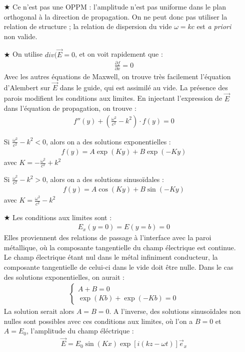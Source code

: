 \documentclass{report}
\begin{document}
\begin{itemize}

	\item[$\bigstar$] Ce n'est pas une OPPM : l'amplitude n'est pas uniforme dans le plan orthogonal à la direction de propagation. On ne peut donc pas utiliser la relation de structure ; la relation de dispersion du vide $\omega=kc$ est \textit{a priori} non valide.
	
	\item[$\bigstar$] On utilise $div(\vec{E}=0$, et on voit rapidement que :
	\begin{align*}
		\frac{\partial f}{\partial x} =0 
	\end{align*}
	Avec les autres équations de Maxwell, on trouve très facilement l'équation d'Alembert sur $\vec{E}$ dans le guide, qui est assimilé au vide. La présence des parois modifient les conditions aux limites. En injectant l'expression de $\vec{E}$ dans l'équation de propagation, on trouve :
	\begin{align*}
		f''(y)+\left(\frac{\omega^2}{c^2} - k^2 \right)\cdot f(y) =0
	\end{align*}
	
	Si $\frac{\omega^2}{c^2} - k^2<0$, alors on a des solutions exponentielles :
	\begin{align*}
		f(y)=A\exp(Ky)+B\exp(-Ky)
	\end{align*}
	avec $K=-\frac{\omega^2}{c^2} + k^2$
	
	Si $\frac{\omega^2}{c^2} - k^2>0$, alors on a des solutions sinusoïdales :
	\begin{align*}
		f(y)=A\cos(Ky)+B\sin(-Ky)
	\end{align*}
	avec $K=\frac{\omega^2}{c^2} - k^2$
	
	\item[$\bigstar$] Les conditions aux limites sont :
	\begin{align*}
		E_x(y=0)=E(y=b)=0
	\end{align*}
	Elles proviennent des relations de passage à l'interface avec la paroi métallique, où la composante tangentielle du champ électrique est continue. Le champ électrique étant nul dans le métal infiniment conducteur, la composante tangentielle de celui-ci dans le vide doit être nulle.
	Dans le cas des solutions exponentielles, on aurait :
	\begin{align}
    	\begin{cases}
        A+B  =0\\
     	\exp(Kb)+\exp(-Kb) = 0
    \end{cases}  
	\end{align}
	La solution serait alors $A=B=0$. A l'inverse, des solutions sinusoïdales non nulles sont possibles avec ces conditions aux limites, où l'on a $B=0$ et $A=E_0$, l'amplitude du champ éléctrique :
	\begin{align*}
		\vec{E}=E_0\sin(Kx)\exp[i(kz-\omega t)]\vec{e}_x
	\end{align*}
	

\end{itemize}
\end{document}
